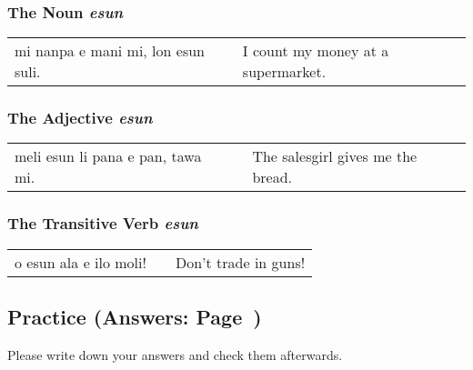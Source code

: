 %
%
%
%
\subsubsection*{The Noun \textit{esun}}
%

\begin{supertabular}{p{5,5cm}|ll}
mi nanpa e mani mi, lon esun suli. && I count my money at a supermarket. \\
\end{supertabular}

%
%
\subsubsection*{The Adjective \textit{esun}}
%

\begin{supertabular}{p{5,5cm}|ll}
meli esun li pana e pan, tawa mi. && The salesgirl gives me the bread. \\
\end{supertabular}

%
%
\subsubsection*{The Transitive Verb \textit{esun}}
%

\begin{supertabular}{p{5,5cm}|ll}
o esun ala e ilo moli! && Don't trade in guns! \\
\end{supertabular}

%
%
%
\newpage
%
\subsection*{Practice (Answers: Page~\pageref{'numbers'})}
%
Please write down your answers and check them afterwards. 

